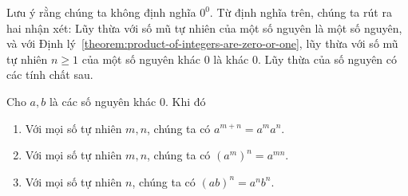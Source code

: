 Lưu ý rằng chúng ta không định nghĩa $0^{0}$. Từ định nghĩa trên, chúng ta rút ra hai nhận xét: Lũy thừa với số mũ tự nhiên của một số nguyên là một số nguyên, và với Định lý~\ref{theorem:product-of-integers-are-zero-or-one}, lũy thừa với số mũ tự nhiên $n\geq 1$ của một số nguyên khác $0$ là khác $0$. Lũy thừa của số nguyên có các tính chất sau.

\begin{theorem}
    Cho $a, b$ là các số nguyên khác $0$. Khi đó
    \begin{enumerate}[topsep=0pt,itemsep=0pt,label={(\roman*)}]
        \item Với mọi số tự nhiên $m, n$, chúng ta có $a^{m+n} = a^{m}a^{n}$.
        \item Với mọi số tự nhiên $m, n$, chúng ta có ${(a^{m})}^{n} = a^{mn}$.
        \item Với mọi số tự nhiên $n$, chúng ta có ${(ab)}^{n} = a^{n}b^{n}$.
    \end{enumerate}
\end{theorem}

